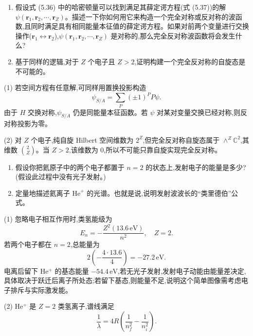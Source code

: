 \begin{question}
\begin{enumerate}
\item 假设式 (5.36) 中的哈密顿量可以找到满足其薛定谔方程(式 (5.37))的解 $\psi(\mathbf r_1,\mathbf r_2,\cdots,\mathbf r_Z)$。描述一下你如何用它来构造一个完全对称或反对称的波函数,且同时满足具有相同能量本征值的薛定谔方程。如果对前两个变量进行交换操作($\mathbf r_1\leftrightarrow\mathbf r_2$),$\psi(\mathbf r_1,\mathbf r_2,\cdots,\mathbf r_Z)$ 是对称的,那么完全反对称波函数将会发生什么?
\item 基于同样的逻辑,对于 $Z$ 个电子且 $Z>2$,证明构建一个完全反对称的自旋态是不可能的。
\end{enumerate}

\par\smallskip
{}

\begin{solution}

(1) 若空间方程有任意解,可同样用置换投影构造
\[
\psi_{S/A}=\sum_P(\pm1)^P P\psi.
\]
由于 $H$ 交换对称,$\psi_{S/A}$ 仍是同能量本征函数。若 $\psi$ 对某对变量交换已经对称,则反对称投影为零。

(2) 对 $Z$ 个电子,纯自旋 Hilbert 空间维数为 $2^Z$,但完全反对称自旋态属于 $\wedge^Z\mathbb C^2$,其维数 $\binom2Z$。当 $Z>2$,该维数为 0,所以不可能只靠自旋实现完全反对称。

\end{solution}
\end{question}

\begin{question}
\begin{enumerate}
\item 假设你把氦原子中的两个电子都置于 $n=2$ 的状态上,发射电子的能量是多少?(假设此过程中没有光子发射。)
\item 定量地描述氦离子 $\mathrm{He}^{+}$ 的光谱。也就是说,说明发射波波长的“类里德伯”公式。
\end{enumerate}
\begin{solution}

(1) 忽略电子相互作用时,类氢能级为
\[
E_n=-\frac{Z^2(13.6\,\mathrm{eV})}{n^2},\quad Z=2.
\]
若两个电子都在 $n=2$,总能量为
\[
2\left(-\frac{4\cdot13.6}{4}\right)=-27.2\,\mathrm{eV}.
\]
电离后留下 He$^+$ 的基态能量 $-54.4\,\mathrm{eV}$,若无光子发射,发射电子动能由能量差决定,具体取决于跃迁后离子所处态;若留下基态,则能量不足,说明这个简单图像需考虑电子排斥与实际激发能。

(2) He$^+$ 是 $Z=2$ 类氢离子,谱线满足
\[
\frac1\lambda=4R\left(\frac1{n_f^2}-\frac1{n_i^2}\right).
\]

\end{solution}
\end{question}


